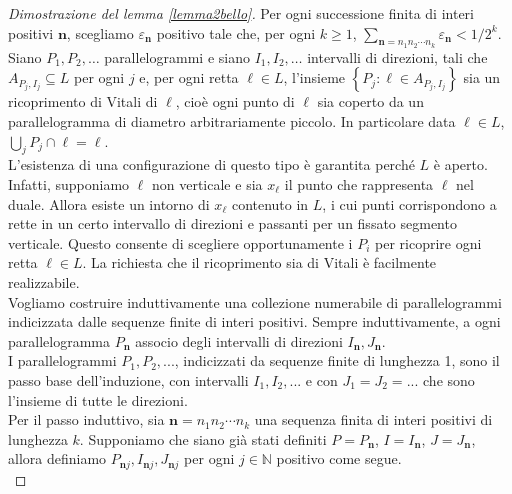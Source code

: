 \documentclass[a4paper, twoside,openright]{article}
\newcommand{\<}{\langle}
\renewcommand{\>}{\rangle}
\begin{document}
\begin{proof}[Dimostrazione del lemma \ref{lemma2bello}]
Per ogni successione finita di interi positivi $\mathbf{n}$, scegliamo $\varepsilon_{\mathbf{n}}$ positivo tale che, per ogni $k\geq 1$, $\sum_{\mathbf{n}=n_{1} n_{2} \cdots n_{k}} \varepsilon_{\mathbf{n}}<1 / 2^{k}$.\\
Siano $P_{1}, P_{2}, \ldots$ parallelogrammi e siano $I_{1}, I_{2}, \ldots$ intervalli di direzioni, tali che $A_{P_{j}, I_{j}} \subseteq L$ per ogni $j$ e, per ogni retta $\ell \in L$, l'insieme $\left\{P_{j}: \ell \in A_{P_{j}, I_{j}}\right\}$ sia un ricoprimento di Vitali di $\ell$, cioè ogni punto di $\ell$ sia coperto da un parallelogramma di diametro arbitrariamente piccolo. In particolare data $\ell \in L$, $ \bigcup_j P_j \cap \ell = \ell $.\\
L'esistenza di una configurazione di questo tipo è garantita perché $L$ è aperto. Infatti, supponiamo $\ell$ non verticale e sia $x_{\ell}$ il punto che rappresenta $\ell$ nel duale. Allora esiste un intorno di $x_{\ell}$ contenuto in $L$, i cui punti corrispondono a rette in un certo intervallo di direzioni e passanti per un fissato segmento verticale. Questo consente di scegliere opportunamente i $P_i$ per ricoprire ogni retta $\ell \in L$. La richiesta che il ricoprimento sia di Vitali è facilmente realizzabile.\\

Vogliamo costruire induttivamente una collezione numerabile di parallelogrammi indicizzata dalle sequenze finite di interi positivi. Sempre induttivamente, a ogni parallelogramma $P_{\mathbf{n}}$ associo degli intervalli di direzioni $I_{\mathbf{n}}, J_{\mathbf{n}}$.\\
I parallelogrammi $P_1, P_2,...$, indicizzati da sequenze finite di lunghezza 1, sono il passo base dell'induzione, con intervalli $I_1, I_2,...$ e con $J_1=J_2=...$ che sono l'insieme di tutte le direzioni.\\
Per il passo induttivo, sia $\mathbf{n}=n_{1} n_{2} \cdots n_{k}$ una sequenza finita di interi positivi di lunghezza $k$. Supponiamo che siano già stati definiti $P=P_{\mathbf{n}}$, $I=I_{\mathbf{n}}$, $J=J_{\mathbf{n}}$, allora definiamo $P_{\mathbf{n} j}, I_{\mathbf{n} j}, J_{\mathbf{n} j}$ per ogni $j \in \mathbb{N}$ positivo come segue.\\


\end{proof}
\end{document}
